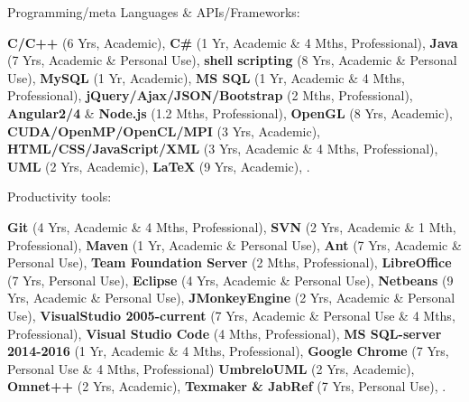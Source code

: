 \begin{cventries}

  \cventry
    {Programming/meta Languages \& APIs/Frameworks:} %
    {} %
    {} %
    {} %
    { 
      \begin{cvitems} %
        \item {
        \textbf{C/C++} (6 Yrs, Academic), 
        \textbf{C\#} (1 Yr, Academic \& 4 Mths, Professional), 
        \textbf{Java} (7 Yrs, Academic \& Personal Use), 
        \textbf{shell scripting} (8 Yrs, Academic \& Personal Use), 
        \textbf{MySQL} (1 Yr, Academic), 
        \textbf{MS SQL} (1 Yr, Academic \& 4 Mths, Professional), 
        \textbf{jQuery/Ajax/JSON/Bootstrap} (2 Mths, Professional), 
        \textbf{Angular2/4} \& \textbf{Node.js} (1.2 Mths, Professional), 
		\textbf{OpenGL} (8 Yrs, Academic),         
        \textbf{CUDA/OpenMP/OpenCL/MPI} (3 Yrs, Academic), 
        \textbf{HTML/CSS/JavaScript/XML} (3 Yrs, Academic \& 4 Mths, Professional), 
        \textbf{UML} (2 Yrs, Academic),
        \textbf{LaTeX} (9 Yrs, Academic),
		.}
	  \end{cvitems}
    }  
  \vspace{-0.4cm}

  \cventry
    {Productivity tools:} %
    {} %
    {} %
    {} %
    {
      \begin{cvitems} %
        \item {
        \textbf{Git} (4 Yrs, Academic \& 4 Mths, Professional), 
        \textbf{SVN} (2 Yrs, Academic \& 1 Mth, Professional), 
        \textbf{Maven} (1 Yr, Academic \& Personal Use), 
        \textbf{Ant} (7 Yrs, Academic \& Personal Use), 
        \textbf{Team Foundation Server} (2 Mths, Professional), 
        \textbf{LibreOffice} (7 Yrs, Personal Use), 
        \textbf{Eclipse} (4 Yrs, Academic \& Personal Use), 
        \textbf{Netbeans} (9 Yrs, Academic \& Personal Use), 
        \textbf{JMonkeyEngine} (2 Yrs, Academic \& Personal Use), 
        \textbf{VisualStudio 2005-current} (7 Yrs, Academic \& Personal Use \& 4 Mths, Professional), 
        \textbf{Visual Studio Code} (4 Mths, Professional), 
        \textbf{MS SQL-server 2014-2016} (1 Yr, Academic \& 4 Mths, Professional),
        \textbf{Google Chrome} (7 Yrs, Personal Use \& 4 Mths, Professional) 
        \textbf{UmbreloUML} (2 Yrs, Academic),
        \textbf{Omnet++} (2 Yrs, Academic),
        \textbf{Texmaker \& JabRef} (7 Yrs, Personal Use),    
        .}       
      \end{cvitems}
    }  
  \vspace{-0.4cm}  
    

\end{cventries}
